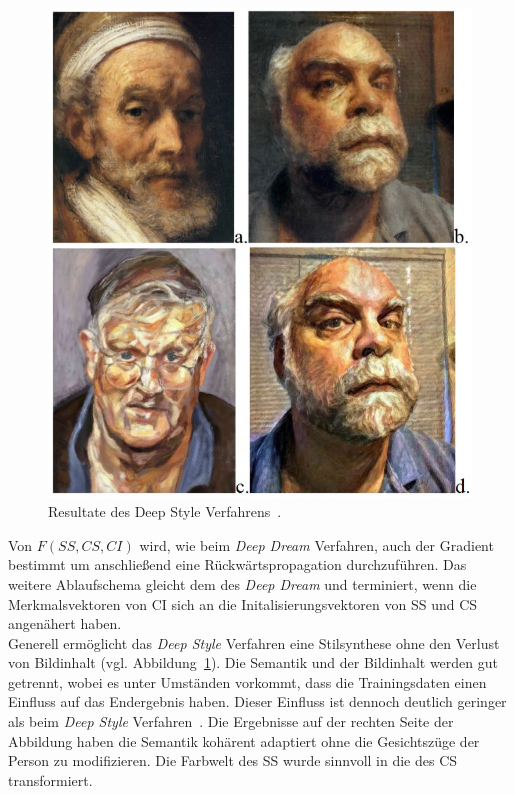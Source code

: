 \documentclass[times, 11pt,twocolumn]{article}
\begin{document}
\begin{figure}
	\flushleft
	\includegraphics[width=\columnwidth]{Bilder/DeepStyleResults.JPG}
	\caption{Resultate des Deep Style Verfahrens~\cite{McCaigDG16}.}
	\label{fig:DeepStyleResults}
\end{figure}
Von $F(SS,CS,CI)$ wird, wie beim \textit{Deep Dream} Verfahren, auch der Gradient bestimmt um anschließend eine Rückwärtspropagation durchzuführen. Das weitere Ablaufschema gleicht dem des \textit{Deep Dream} und terminiert, wenn die Merkmalsvektoren von CI sich an die Initalisierungsvektoren von SS und CS angenähert haben.\\

Generell ermöglicht das \textit{Deep Style} Verfahren eine Stilsynthese ohne den Verlust von Bildinhalt (vgl. Abbildung~\ref{fig:DeepStyleResults}). Die Semantik und der Bildinhalt werden gut getrennt, wobei es unter Umständen vorkommt, dass die Trainingsdaten einen Einfluss auf das Endergebnis haben. Dieser Einfluss ist dennoch deutlich geringer als beim \textit{Deep Style} Verfahren~\cite{McCaigDG16}. Die Ergebnisse auf der rechten Seite der Abbildung haben die Semantik kohärent adaptiert ohne die Gesichtszüge der Person zu modifizieren. Die Farbwelt des SS wurde sinnvoll in die des CS transformiert. 
\end{document}
